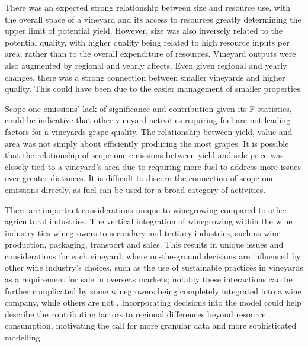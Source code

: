 \documentclass[review,12pt,authoryear]{elsarticle}
\begin{document}
\begin{linenumbers}
There was an expected strong relationship between size and resource use, with the overall space of a vineyard and its access to resources greatly determining the upper limit of potential yield. However, size was also inversely related to the potential quality, with higher quality being related to high resource inputs per area; rather than to the overall expenditure of resources. Vineyard outputs were also augmented by regional and yearly affects. Even given regional and yearly changes, there was a strong connection between smaller vineyards and higher quality. This could have been due to the easier management of smaller properties.
\par
Scope one emissions' lack of significance and contribution given its F-statistics, could be indicative that other vineyard activities requiring fuel are not leading factors for a vineyards grape quality. The relationship between yield, value and area was not simply about efficiently producing the most grapes. It is possible that the relationship of scope one emissions between yield and sale price was closely tied to a vineyard's area due to requiring more fuel to address more issues over greater distances. It is difficult to discern the connection of scope one emissions directly, as fuel can be used for a broad category of activities. 
\par
There are important considerations unique to winegrowing compared to other agricultural industries. The vertical integration of winegrowing within the wine industry ties winegrowers to secondary and tertiary industries, such as wine production, packaging, transport and sales. This results in unique issues and considerations for each vineyard, where on-the-ground decisions are influenced by other wine industry's choices, such as the use of sustainable practices in vineyards as a requirement for sale in overseas markets; notably these interactions can be further complicated by some winegrowers being completely integrated into a wine company, while others are not \citep{knightFirmResourcesDevelopment2019}. Incorporating decisions into the model could help describe the contributing factors to regional differences beyond resource consumption, motivating the call for more granular data and more sophisticated modelling.
\par

\end{linenumbers}
\end{document}
